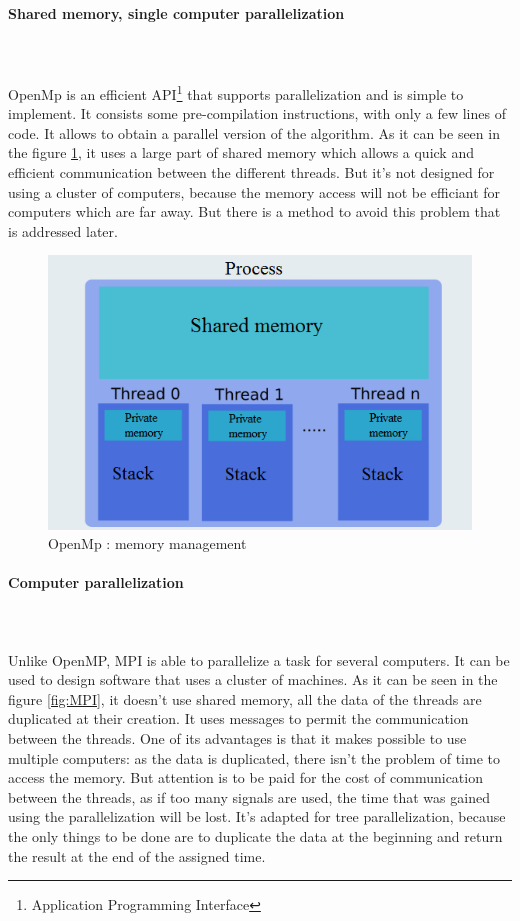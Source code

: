 \paragraph{Shared memory, single computer parallelization}\mbox{}\\\mbox{}\\
OpenMp is an efficient API\footnote{Application Programming Interface} that supports parallelization and is simple to implement. It consists some pre-compilation instructions, with only a few lines of code. It allows to obtain a parallel version of the algorithm. As it can be seen in the figure \ref{fig:OpenMp}, it uses a large part of shared memory which allows a quick and efficient communication between the different threads. But it's not designed for using a cluster of computers, because the memory access will not be efficiant for computers which are far away. But there is a method to avoid this problem that is addressed later.
\begin{figure}[!h] 
\centerline{\includegraphics[scale=0.50]{3_Software_considered/MultithreadingMP_boost_Visual_MPI_5000_Zotero_Project_Baptiste/OpenMP}}
   \caption{\label{étiquette} OpenMp : memory management}
\label{fig:OpenMp}
\end{figure}
\newpage
\paragraph{Computer parallelization}\mbox{}\\\mbox{}\\
Unlike OpenMP, MPI is able to parallelize a task for several computers. It can be used to design software that uses a cluster of machines. As it can be seen in the figure \ref{fig:MPI}, it doesn't use shared memory, all the data of the threads are duplicated at their creation. It uses messages to permit the communication between the threads. One of its advantages is that it makes possible to use multiple computers: as the data is duplicated, there isn't the problem of time to access the memory. But attention is to be paid for the cost of communication between the threads, as if too many signals are used, the time that was gained using the parallelization will be lost. It's adapted for tree parallelization, because the only things to be done are to duplicate the data at the beginning and return the result at the end of the assigned time.

